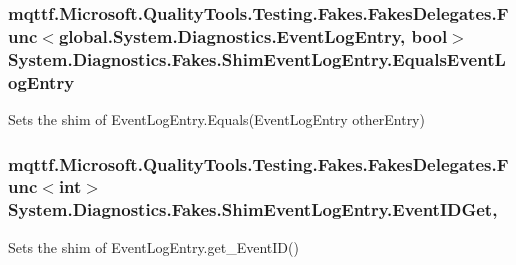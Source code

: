 \hypertarget{class_system_1_1_diagnostics_1_1_fakes_1_1_shim_event_log_entry_abdf32ccd1d2939da65f79f0a9ab2bf9f}{
\subsubsection[{Equals\-Event\-Log\-Entry}]{\setlength{\rightskip}{0pt plus 5cm}mqttf.\-Microsoft.\-Quality\-Tools.\-Testing.\-Fakes.\-Fakes\-Delegates.\-Func$<$global.\-System.\-Diagnostics.\-Event\-Log\-Entry, bool$>$ System.\-Diagnostics.\-Fakes.\-Shim\-Event\-Log\-Entry.\-Equals\-Event\-Log\-Entry\hspace{0.3cm}{\ttfamily [set]}}}\label{class_system_1_1_diagnostics_1_1_fakes_1_1_shim_event_log_entry_abdf32ccd1d2939da65f79f0a9ab2bf9f}


Sets the shim of Event\-Log\-Entry.\-Equals(\-Event\-Log\-Entry other\-Entry)

\hypertarget{class_system_1_1_diagnostics_1_1_fakes_1_1_shim_event_log_entry_a06b76ac10bf94472887703c3747a863a}{
\subsubsection[{Event\-I\-D\-Get}]{\setlength{\rightskip}{0pt plus 5cm}mqttf.\-Microsoft.\-Quality\-Tools.\-Testing.\-Fakes.\-Fakes\-Delegates.\-Func$<$int$>$ System.\-Diagnostics.\-Fakes.\-Shim\-Event\-Log\-Entry.\-Event\-I\-D\-Get\hspace{0.3cm}{\ttfamily [get]}, {\ttfamily [set]}}}\label{class_system_1_1_diagnostics_1_1_fakes_1_1_shim_event_log_entry_a06b76ac10bf94472887703c3747a863a}


Sets the shim of Event\-Log\-Entry.\-get\-\_\-\-Event\-I\-D()

